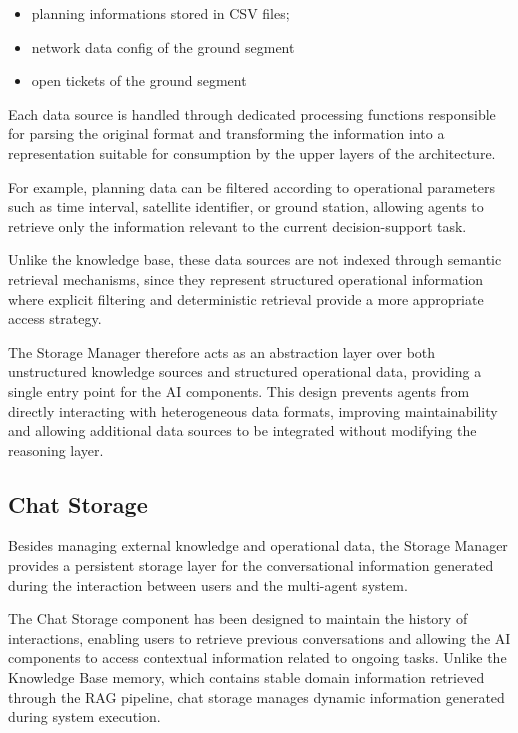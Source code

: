 \begin{itemize}
    \item planning informations stored in CSV files;
    \item network data config of the ground segment
    \item open tickets of the ground segment
\end{itemize}

Each data source is handled through dedicated processing functions responsible for parsing the original format and transforming the information into a representation suitable for consumption by the upper layers of the architecture.

For example, planning data can be filtered according to operational parameters such as time interval, satellite identifier, or ground station, allowing agents to retrieve only the information relevant to the current decision-support task. 

Unlike the knowledge base, these data sources are not indexed through semantic retrieval mechanisms, since they represent structured operational information where explicit filtering and deterministic retrieval provide a more appropriate access strategy.

The Storage Manager therefore acts as an abstraction layer over both unstructured knowledge sources and structured operational data, providing a single entry point for the AI components. This design prevents agents from directly interacting with heterogeneous data formats, improving maintainability and allowing additional data sources to be integrated without modifying the reasoning layer.


\subsection{Chat Storage}

Besides managing external knowledge and operational data, the Storage Manager provides a persistent storage layer for the conversational information generated during the interaction between users and the multi-agent system.

The Chat Storage component has been designed to maintain the history of interactions, enabling users to retrieve previous conversations and allowing the AI components to access contextual information related to ongoing tasks. Unlike the Knowledge Base memory, which contains stable domain information retrieved through the RAG pipeline, chat storage manages dynamic information generated during system execution.

